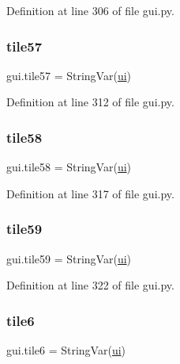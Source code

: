 Definition at line 306 of file gui.\+py.

\mbox{\label{namespacegui_aa3077c3a423a682ff87cf7a59a096a1a}} 
\subsubsection{\texorpdfstring{tile57}{tile57}}
{\footnotesize\ttfamily gui.\+tile57 = String\+Var(\mbox{\hyperlink{namespacegui_a40ab7281456eadbea2dc2038f5c24fa1}{ui}})}



Definition at line 312 of file gui.\+py.

\mbox{\label{namespacegui_a99c90d661722beb1c379e2d9fc6169a4}} 
\subsubsection{\texorpdfstring{tile58}{tile58}}
{\footnotesize\ttfamily gui.\+tile58 = String\+Var(\mbox{\hyperlink{namespacegui_a40ab7281456eadbea2dc2038f5c24fa1}{ui}})}



Definition at line 317 of file gui.\+py.

\mbox{\label{namespacegui_a841a445f892ff85a173e8562fe380797}} 
\subsubsection{\texorpdfstring{tile59}{tile59}}
{\footnotesize\ttfamily gui.\+tile59 = String\+Var(\mbox{\hyperlink{namespacegui_a40ab7281456eadbea2dc2038f5c24fa1}{ui}})}



Definition at line 322 of file gui.\+py.

\mbox{\label{namespacegui_a05831122e36776d57f98dedba4233034}} 
\subsubsection{\texorpdfstring{tile6}{tile6}}
{\footnotesize\ttfamily gui.\+tile6 = String\+Var(\mbox{\hyperlink{namespacegui_a40ab7281456eadbea2dc2038f5c24fa1}{ui}})}



